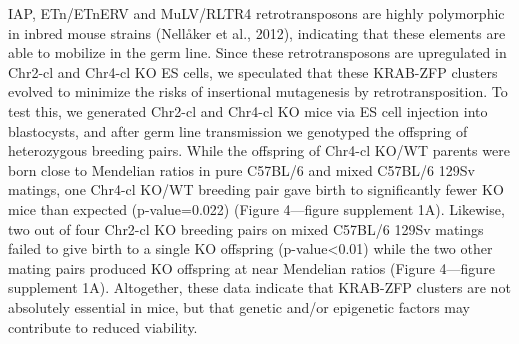 \documentclass[11pt,a4paper]{article}
\begin{document}
IAP, ETn/ETnERV and MuLV/RLTR4 retrotransposons are highly polymorphic in inbred mouse strains (Nellåker et al., 2012), indicating that these elements are able to mobilize in the germ line. Since these retrotransposons are upregulated in Chr2-cl and Chr4-cl KO ES cells, we speculated that these KRAB-ZFP clusters evolved to minimize the risks of insertional mutagenesis by retrotransposition. To test this, we generated Chr2-cl and Chr4-cl KO mice via ES cell injection into blastocysts, and after germ line transmission we genotyped the offspring of heterozygous breeding pairs. While the offspring of Chr4-cl KO/WT parents were born close to Mendelian ratios in pure C57BL/6 and mixed C57BL/6 129Sv matings, one Chr4-cl KO/WT breeding pair gave birth to significantly fewer KO mice than expected (p-value=0.022) (Figure 4—figure supplement 1A). Likewise, two out of four Chr2-cl KO breeding pairs on mixed C57BL/6 129Sv matings failed to give birth to a single KO offspring (p-value<0.01) while the two other mating pairs produced KO offspring at near Mendelian ratios (Figure 4—figure supplement 1A). Altogether, these data indicate that KRAB-ZFP clusters are not absolutely essential in mice, but that genetic and/or epigenetic factors may contribute to reduced viability.
\end{document}

